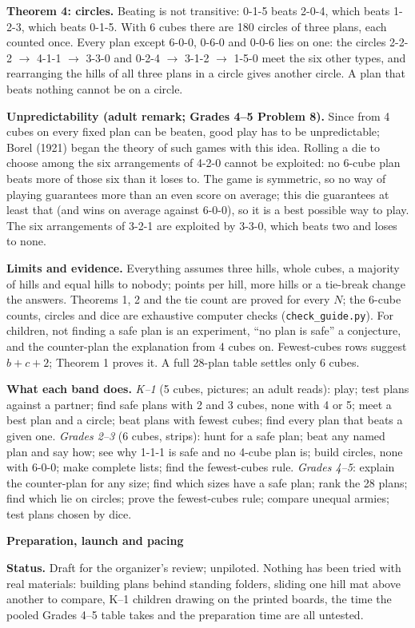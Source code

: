 \documentclass[11pt]{article}
\newcommand{\head}[1]{\par\textbf{\large #1}\par}
\begin{document}
\textbf{Theorem 4: circles.} Beating is not transitive: 0-1-5 beats 2-0-4, which beats 1-2-3, which beats 0-1-5. With 6 cubes there are 180 circles of three plans, each counted once. Every plan except 6-0-0, 0-6-0 and 0-0-6 lies on one: the circles 2-2-2 $\to$ 4-1-1 $\to$ 3-3-0 and 0-2-4 $\to$ 3-1-2 $\to$ 1-5-0 meet the six other types, and rearranging the hills of all three plans in a circle gives another circle. A plan that beats nothing cannot be on a circle.

\textbf{Unpredictability (adult remark; Grades 4--5 Problem 8).} Since from 4 cubes on every fixed plan can be beaten, good play has to be unpredictable; Borel (1921) began the theory of such games with this idea. Rolling a die to choose among the six arrangements of 4-2-0 cannot be exploited: no 6-cube plan beats more of those six than it loses to. The game is symmetric, so no way of playing guarantees more than an even score on average; this die guarantees at least that (and wins on average against 6-0-0), so it is a best possible way to play. The six arrangements of 3-2-1 are exploited by 3-3-0, which beats two and loses to none.

\textbf{Limits and evidence.} Everything assumes three hills, whole cubes, a majority of hills and equal hills to nobody; points per hill, more hills or a tie-break change the answers. Theorems 1, 2 and the tie count are proved for every $N$; the 6-cube counts, circles and dice are exhaustive computer checks (\texttt{check\_guide.py}). For children, not finding a safe plan is an experiment, ``no plan is safe'' a conjecture, and the counter-plan the explanation from 4 cubes on. Fewest-cubes rows suggest $b+c+2$; Theorem 1 proves it. A full 28-plan table settles only 6 cubes.

\textbf{What each band does.} \emph{K--1} (5 cubes, pictures; an adult reads): play; test plans against a partner; find safe plans with 2 and 3 cubes, none with 4 or 5; meet a best plan and a circle; beat plans with fewest cubes; find every plan that beats a given one. \emph{Grades 2--3} (6 cubes, strips): hunt for a safe plan; beat any named plan and say how; see why 1-1-1 is safe and no 4-cube plan is; build circles, none with 6-0-0; make complete lists; find the fewest-cubes rule. \emph{Grades 4--5}: explain the counter-plan for any size; find which sizes have a safe plan; rank the 28 plans; find which lie on circles; prove the fewest-cubes rule; compare unequal armies; test plans chosen by dice.
\newpage
\head{Preparation, launch and pacing}
\textbf{Status.} Draft for the organizer's review; unpiloted. Nothing has been tried with real materials: building plans behind standing folders, sliding one hill mat above another to compare, K--1 children drawing on the printed boards, the time the pooled Grades 4--5 table takes and the preparation time are all untested.
\end{document}

